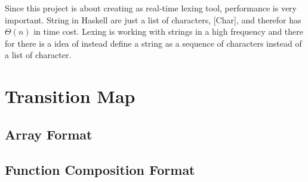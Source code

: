 Since this project is about creating as real-time lexing tool, performance is very important. String in Haskell are just a list of characters, [Char], and therefor has $\Theta(n)$ in time cost. Lexing is working with strings in a high frequency and there for there is a idea of instead define a string as a sequence of characters instead of a list of character. 

\section{Transition Map}
\subsection{Array Format}
\subsection{Function Composition Format}
